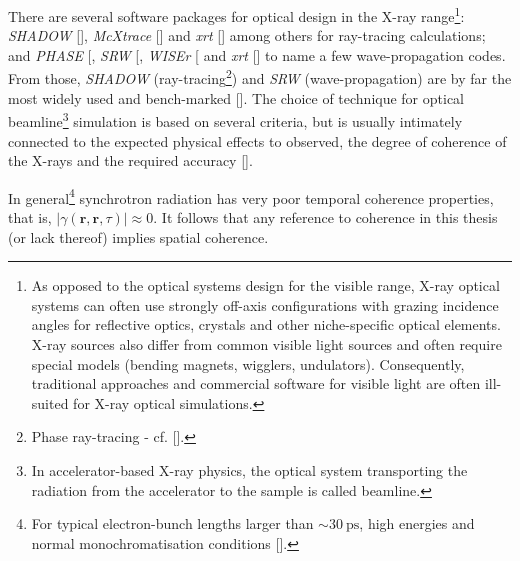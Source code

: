 \begin{refsection}
There are several software packages for optical design in the X-ray range\footnote{As opposed to the optical systems design for the visible range, X-ray optical systems can often use strongly off-axis configurations with grazing incidence angles for reflective optics, crystals and other niche-specific optical elements. X-ray sources also differ from common visible light sources and often require special models (bending magnets, wigglers, undulators). Consequently, traditional approaches and commercial software for visible light are often ill-suited for X-ray optical simulations.}: \textit{SHADOW} [\cite{Lai1986}], \textit{McXtrace} [\cite{BergbackKnudsen2013}] and \textit{xrt} [\cite{Klementiev2014}] among others for ray-tracing calculations; and  \textit{PHASE} [\cite{Bahrdt1997}, \textit{SRW} [\cite{Chubar1998}, \textit{WISEr} [\cite{Raimondi2010} and \textit{xrt} [\cite{Chernikov2017}] to name a few wave-propagation codes. From those, \textit{SHADOW} (ray-tracing\footnote{Phase ray-tracing - cf. [\cite{Lee2007,SanchezdelRio2011}].}) and \textit{SRW} (wave-propagation) are by far the most widely used and bench-marked [\cite{Rio2013,Chubar2014}]. The choice of technique for optical beamline\footnote{In accelerator-based X-ray physics, the optical system transporting the radiation from the accelerator to the sample is called beamline.} simulation is based on several criteria, but is usually intimately connected to the expected physical effects to observed, the degree of coherence of the X-rays and the required accuracy [\cite{SanchezdelRio2019}].

In general\footnote{For typical electron-bunch lengths larger than $\sim30~\text{ps}$, high energies and normal monochromatisation conditions [\cite{Geloni2008}].} synchrotron radiation has very poor temporal coherence properties, that is, $|\gamma(\textbf{r},\textbf{r},\tau)|\approx0$. It follows that any reference to coherence in this thesis (or lack thereof) implies spatial coherence.


\end{refsection}
